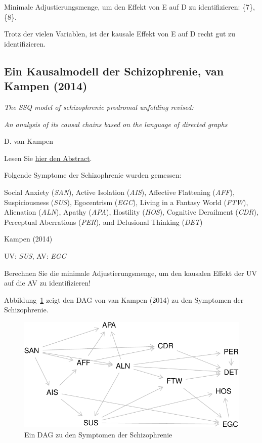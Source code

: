 \documentclass[
  a4paper,
  DIV=11]{scrreprt}
\theoremstyle{definition}
\theoremstyle{remark}
\begin{document}
Minimale Adjustierungsmenge, um den Effekt von E auf D zu
identifizieren: \{7\}, \{8\}.

Trotz der vielen Variablen, ist der kausale Effekt von E auf D recht gut
zu identifizieren.

\hypertarget{ein-kausalmodell-der-schizophrenie-van-kampen-2014}{%
\subsection{Ein Kausalmodell der Schizophrenie, van Kampen
(2014)}\label{ein-kausalmodell-der-schizophrenie-van-kampen-2014}}

\emph{The SSQ model of schizophrenic prodromal unfolding revised:}

\emph{An analysis of its causal chains based on the language of directed
graphs}

D. van Kampen

Lesen Sie
\href{https://www.cambridge.org/core/journals/european-psychiatry/article/abs/ssq-model-of-schizophrenic-prodromal-unfolding-revised-an-analysis-of-its-causal-chains-based-on-the-language-of-directed-graphs/F2E7BBFC1B392616DB894AFBFABE7818}{hier
den Abstract}.

Folgende Symptome der Schizophrenie wurden gemessen:

Social Anxiety (\emph{SAN}), Active Isolation (\emph{AIS}), Affective
Flattening (\emph{AFF}), Suspiciousness (\emph{SUS}), Egocentrism
(\emph{EGC}), Living in a Fantasy World (\emph{FTW}), Alienation
(\emph{ALN}), Apathy (\emph{APA}), Hostility (\emph{HOS}), Cognitive
Derailment (\emph{CDR}), Perceptual Aberrations (\emph{PER}), and
Delusional Thinking (\emph{DET})

Kampen (2014)

UV: \emph{SUS}, AV: \emph{EGC}

Berechnen Sie die minimale Adjustierungsmenge, um den kausalen Effekt
der UV auf die AV zu identifizieren!

Abbildung~\ref{fig-van-kampen} zeigt den DAG von van Kampen (2014) zu
den Symptomen der Schizophrenie.

\begin{figure}

{\centering \includegraphics{./abschluss_files/figure-pdf/fig-van-kampen-1.pdf}

}

\caption{\label{fig-van-kampen}Ein DAG zu den Symptomen der
Schizophrenie}

\end{figure}
\end{document}
